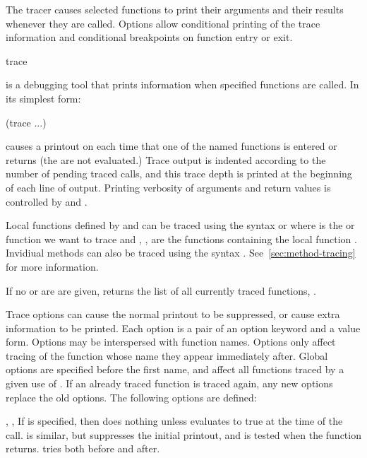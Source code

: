 The tracer causes selected functions to print their arguments and
their results whenever they are called.  Options allow conditional
printing of the trace information and conditional breakpoints on
function entry or exit.

\begin{defmac}{}{trace}{%
    }
  
   is a debugging tool that prints information when
  specified functions are called.  In its simplest form:
  \begin{example}
    (trace   ...)
  \end{example}
   causes a printout on  each time
  that one of the named functions is entered or returns (the
   are not evaluated.)  Trace output is indented according
  to the number of pending traced calls, and this trace depth is
  printed at the beginning of each line of output.  Printing verbosity
  of arguments and return values is controlled by
   and .

  Local functions defined by  and  can be
  traced using the syntax  or  where  is the  or 
  function we want to trace and , , are the
  functions containing the local function .
  Invidiual methods can also be traced using the syntax .
  See~\ref{sec:method-tracing} for more information.

  If no  or  are are given, 
  returns the list of all currently traced functions,
  .
  
  Trace options can cause the normal printout to be suppressed, or
  cause extra information to be printed.  Each option is a pair of an
  option keyword and a value form.  Options may be interspersed with
  function names.  Options only affect tracing of the function whose
  name they appear immediately after.  Global options are specified
  before the first name, and affect all functions traced by a given
  use of .  If an already traced function is traced again,
  any new options replace the old options.  The following options are
  defined:
  \begin{Lentry}
  \item[\kwd{condition} \var{form}, \kwd{condition-after} \var{form},
    \kwd{condition-all} \var{form}] If  is specified,
    then  does nothing unless  evaluates to true
    at the time of the call.   is similar, but
    suppresses the initial printout, and is tested when the function
    returns.   tries both before and after.
    

\end{Lentry}
\end{defmac}
